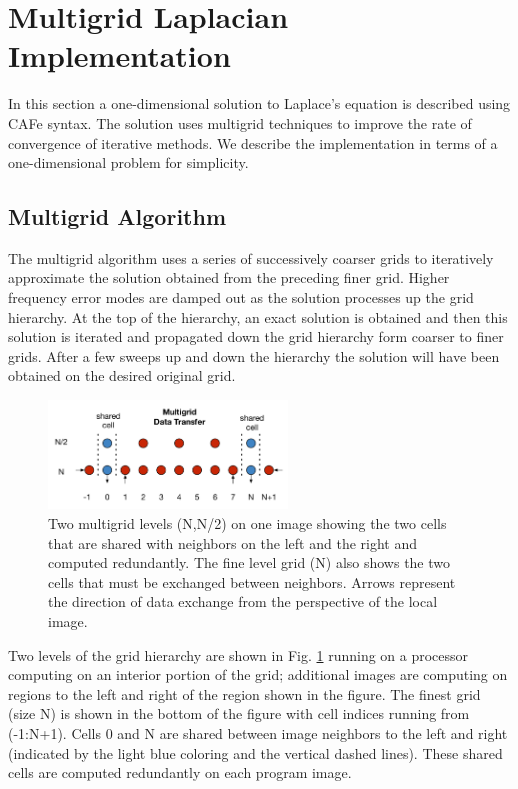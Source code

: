 \section{Multigrid Laplacian Implementation}

In this section a one-dimensional solution to Laplace's equation is described using CAFe
syntax.  The solution uses multigrid techniques to improve the rate of convergence
of iterative methods.  We describe the implementation in terms of a one-dimensional
problem for simplicity.

\subsection{Multigrid Algorithm}

The multigrid algorithm uses a series of successively coarser grids to
iteratively approximate the solution obtained from the preceding
finer grid.  Higher frequency error modes are damped out as the
solution processes up the grid hierarchy.  At the top of the
hierarchy, an exact solution is obtained and then this solution is
iterated and propagated down the grid hierarchy form coarser to finer
grids.  After a few sweeps up and down the hierarchy the solution will
have been obtained on the desired original grid.

\begin{figure}[!t]
\centering
\includegraphics[width=2.5in]{Fig1}
\caption{Two multigrid levels (N,N/2) on one image showing the two cells that are shared with
  neighbors on the left and the right and computed redundantly.  The fine level grid (N)
  also shows the two cells that must be exchanged between neighbors.  Arrows represent the direction
  of data exchange from the perspective of the local image.}
\label{fig_grids}
\end{figure}

Two levels of the grid hierarchy are shown in Fig. \ref{fig_grids} running on a processor computing on
an interior portion of the grid; additional images are computing on regions to the left and right of
the region shown in the figure.  The finest grid (size N) is shown
in the bottom of the figure with cell indices running from (-1:N+1).  Cells 0 and N are shared
between image neighbors to the left and right (indicated by the light blue coloring and the vertical
dashed lines).  These shared cells are computed redundantly on each program image.

